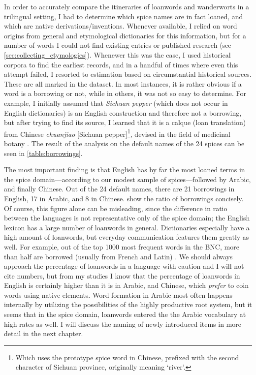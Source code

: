 In order to accurately compare the itineraries of loanwords and \glspl{wanderwort} in a trilingual setting, I had to determine which spice names are in fact loaned, and which are native derivations/inventions. Whenever available, I relied on word origins from general and etymological dictionaries for this information, but for a number of words I could not find existing entries or published research (see \cref{sec:collecting_etymologies}). Whenewer this was the case, I used historical corpora to find the earliest records, and in a handful of times where even this attempt failed, I resorted to estimation based on circumstantial historical sources. These are all marked in the dataset. In most instances, it is rather obvious if a word is a borrowing or not, while in others, it was not so easy to determine. For example, I initially assumed that \textit{Sichuan pepper} (which does not occur in English dictionaries) is an English construction and therefore not a borrowing, but after trying to find its source, I learned that it is a calque (loan translation) from Chinese  \textit{chuanjiao} [Sichuan pepper]\footnote{Which uses the prototype spice word in Chinese, prefixed with the second character of Sichuan province, originally meaning `river'.}, devised in the field of medicinal botany \autocite[140]{hooper_chinese_1929}. The result of the analysis on the default names of the 24 spices can be seen in \cref{table:borrowings}.

The most important finding is that English has by far the most loaned terms in the spice domain---according to our modest sample of spices---followed by Arabic, and finally Chinese. Out of the 24 default names, there are 21 borrowings in English, 17 in Arabic, and 8 in Chinese.  show the ratio of borrowings concisely. Of course, this figure alone can be misleading, since the difference in ratio between the languages is not representative only of the spice domain; the English lexicon has a large number of loanwords in general. Dictionaries especially have a high amount of loanwords, but everyday communication features them greatly as well. For example, out of the top 1000 most frequent words in the \gls{BNC}, more than half are borrowed (usually from French and Latin) \autocite[38]{durkin_borrowed_2014}. We should always approach the percentage of loanwords in a language with caution and I will not cite numbers, but from my studies I know that the percentage of loanwords in English is certainly higher than it is in Arabic, and Chinese, which \textit{prefer} to coin words using native elements. Word formation in Arabic most often happens internally by utilizing the possibilities of the highly productive root system, but it seems that in the spice domain, loanwords entered the the Arabic vocabulary at high rates as well. 
I will discuss the naming of newly introduced items in more detail in the next chapter.

